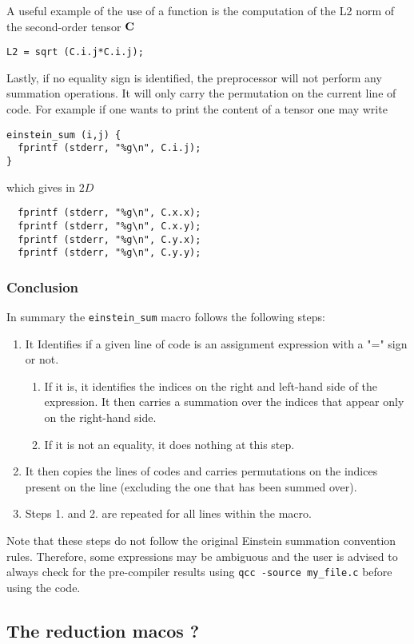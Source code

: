 A useful example of the use of a function is the computation of the L2 norm of the second-order tensor $\textbf C$

\begin{lstlisting}
L2 = sqrt (C.i.j*C.i.j);
\end{lstlisting}

Lastly, if no equality sign is identified, the preprocessor will not perform any summation operations. It will only carry the permutation on the current line of code. For example if one wants to print the content of a tensor one may write 

\begin{lstlisting}
einstein_sum (i,j) {
  fprintf (stderr, "%g\n", C.i.j);
}
\end{lstlisting}

which gives in $2D$

\begin{lstlisting}
  fprintf (stderr, "%g\n", C.x.x);
  fprintf (stderr, "%g\n", C.x.y);
  fprintf (stderr, "%g\n", C.y.x);
  fprintf (stderr, "%g\n", C.y.y);
\end{lstlisting}

\subsubsection{Conclusion}

In summary the \texttt{einstein\_sum} macro follows the following steps:

\begin{enumerate}
    \item  It Identifies if a given line of code is an assignment expression with a "=" sign or not. 
    \begin{enumerate}
    \item If it is, it identifies the indices on the right and left-hand side of the expression. 
       It then carries a summation over the indices that appear only on the right-hand side. 
    \item If it is not an equality, it does nothing at this step. 
    \end{enumerate}
    \item  It then copies the lines of codes and carries permutations on the indices present on the line (excluding the one that has been summed over). 
    \item Steps 1. and 2. are repeated for all lines within the macro. 
\end{enumerate}

Note that these steps do not follow the original Einstein summation convention rules. 
Therefore, some expressions may be ambiguous and the user is advised to always check for the pre-compiler results using \texttt{qcc -source my\_file.c} before using the code.

\subsection{The reduction macos ? }
